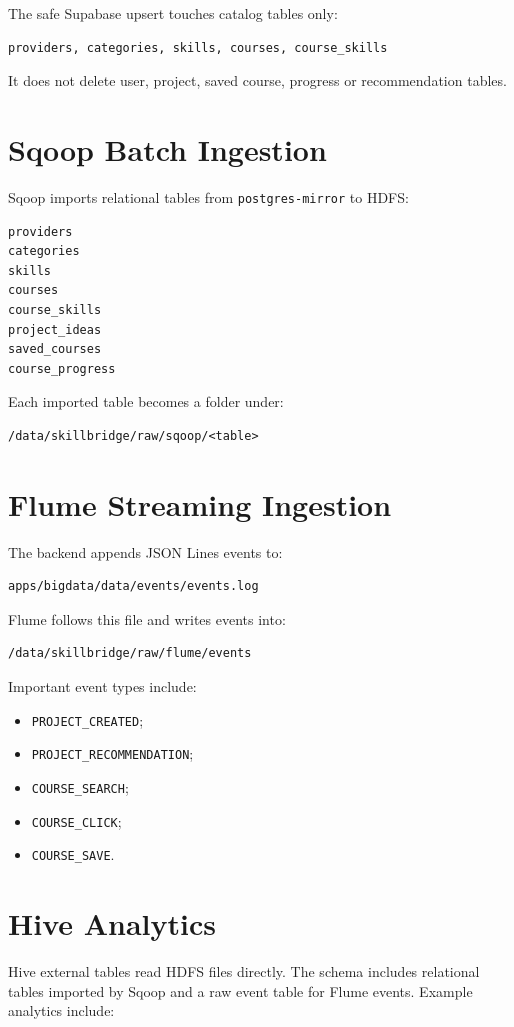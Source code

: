 \documentclass[12pt,a4paper]{report}
\begin{document}
The safe Supabase upsert touches catalog tables only:

\begin{lstlisting}
providers, categories, skills, courses, course_skills
\end{lstlisting}

It does not delete user, project, saved course, progress or recommendation tables.

\section{Sqoop Batch Ingestion}
Sqoop imports relational tables from \texttt{postgres-mirror} to HDFS:

\begin{lstlisting}
providers
categories
skills
courses
course_skills
project_ideas
saved_courses
course_progress
\end{lstlisting}

Each imported table becomes a folder under:

\begin{lstlisting}
/data/skillbridge/raw/sqoop/<table>
\end{lstlisting}

\section{Flume Streaming Ingestion}
The backend appends JSON Lines events to:

\begin{lstlisting}
apps/bigdata/data/events/events.log
\end{lstlisting}

Flume follows this file and writes events into:

\begin{lstlisting}
/data/skillbridge/raw/flume/events
\end{lstlisting}

Important event types include:
\begin{itemize}[leftmargin=*]
    \item \texttt{PROJECT\_CREATED};
    \item \texttt{PROJECT\_RECOMMENDATION};
    \item \texttt{COURSE\_SEARCH};
    \item \texttt{COURSE\_CLICK};
    \item \texttt{COURSE\_SAVE}.
\end{itemize}

\section{Hive Analytics}
Hive external tables read HDFS files directly. The schema includes relational tables imported by Sqoop and a raw event table for Flume events. Example analytics include:
\end{document}

